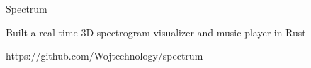 \begin{cvprojects}
  \cvproject
    {Spectrum}
    {}
    {
      \begin{cvitems}
        \item Built a real-time 3D spectrogram visualizer and music player in Rust
      \end{cvitems}
    }
    {https://github.com/Wojtechnology/spectrum}
\end{cvprojects}
